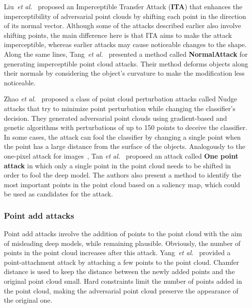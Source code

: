 \documentclass{ieeeaccess}
\def\etal{\textit{et al.}}
\begin{document}
Liu~\etal~\cite{liu2022imperceptible} proposed an Imperceptible Transfer Attack (\textbf{ITA}) that enhances the imperceptibility of adversarial point clouds by shifting each point in the direction of its normal vector. Although some of the attacks described earlier also involve shifting points, the main difference here is that ITA aims to make the attack imperceptible, whereas earlier attacks may cause noticeable changes to the shape. Along the same lines, Tang~\etal~\cite{tang2022normalattack} presented a method called \textbf{NormalAttack} for generating imperceptible point cloud attacks. Their method deforms objects along their normals by considering the object's curvature to make the modification less noticeable.

Zhao \etal~\cite{zhao2020nudge} proposed a class of point cloud perturbation attacks called Nudge attacks that try to minimize point perturbation while changing the classifier's decision. They generated adversarial point clouds using gradient-based and genetic algorithms with perturbations of up to 150 points to deceive the classifier. In some cases, the attack can fool the classifier by changing a single point when the point has a large distance from the surface of the objects.
Analogously to the one-pixel attack for images~\cite{su2019one}, Tan \etal~\cite{tan2023explainability} proposed an attack called \textbf{One point attack} in which only a single point in the point cloud needs to be shifted in order to fool the deep model. The authors also present a method to identify the most important points in the point cloud based on a saliency map, which could be used as candidates for the attack.


\subsubsection{Point add attacks}
\label{subsubsec:Point add attacks}

Point add attacks involve the addition of points to the point cloud with the aim of misleading deep models, while remaining plausible. Obviously, the number of points in the point cloud increases after this attack.
Yang~\etal~\cite{yang2019adversarial} provided a point-attachment attack by attaching a few points to the point cloud. Chamfer distance is used to keep the distance between the newly added points and the original point cloud small. Hard constraints limit the number of points added in the point cloud, making the adversarial point cloud preserve the appearance of the original one. 
\end{document}
